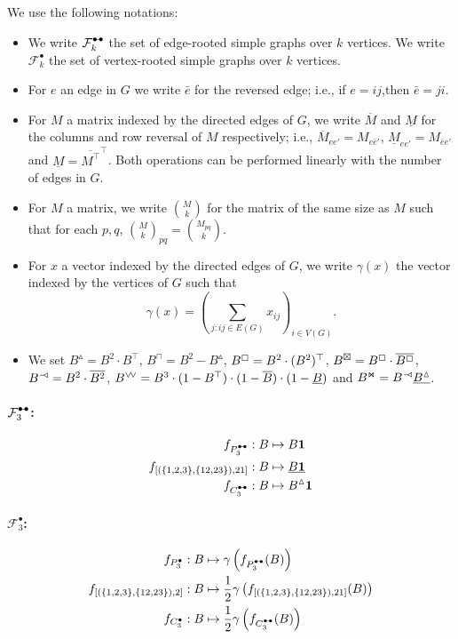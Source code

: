 \documentclass{article}
\theoremstyle{plain}
\begin{document}
We use the following notations:
\begin{itemize}
\item We write $\mathcal{F}_k^{\textcolor{black}{\bullet\!\!-\!\!\bullet}}$ the set of edge-rooted simple graphs over $k$ vertices. We write $\mathcal{F}_k^\bullet$ the set of vertex-rooted simple graphs over $k$ vertices. 
\item For $e$ an edge in $G$ we write $\bar e$ for the reversed edge; i.e., if $e=ij$,then $\bar e = ji$.
\item For $M$ a matrix indexed by the directed edges of $G$, we write $\overline M$ and $\underline M$ for the columns and row reversal of $M$ respectively; i.e., $\overline M_{ee'} = M_{ e \bar e'}$, $\underline M_{ee'} = M_{\bar e e'}$ and $\underline M = \overline{M^\top}^\top$. Both operations can be performed linearly with the number of edges in $G$.
\item For $M$ a matrix, we write $\binom{M}{k}$ for the matrix of the same size as $M$ such that for each $p,q$, $\binom{M}{k}_{pq} = \binom{M_{pq}}{k}$. 
\item For $x$ a vector indexed by the directed edges of $G$, we write $\gamma(x)$ the vector indexed by the vertices of $G$ such that 
\[
\gamma(x) = \left(\sum_{j:ij\in E(G)} x_{ij}\right)
_{i\in V(G)}.
\]
\item We set $B^\vartriangle = B^2\cdot B^\top$, $B^\sqcap = B^2-B^\vartriangle$, $B^\boxempty = B^2\cdot (B^2)^\top$, $B^\boxtimes = B^\boxempty\cdot\overline{B^\boxempty}$, $B^{ \frac{\ }{\ }\hspace{-2pt}\triangleleft } = B^2\cdot \overline{B^2}$, $B^{ \vee\!\vee } = B^3\cdot(1- B^\top)\cdot(1-\overline{B})\cdot(1-\underline{B})$ and $B^{\Join} = B^{ \frac{\ }{\ }\hspace{-2pt}\triangleleft } \underline{B^\vartriangle}$.
\end{itemize}
\paragraph{$\mathcal{F}_3^{\textcolor{black}{\bullet\!\!-\!\!\bullet}}$:}
\begin{align*}
f_{P_3^\dumbbell}: B&\mapsto B{\bf 1}\\
f_{[(\{1,2,3\},\{12,23\}),21]}: B&\mapsto \underline{B{\bf 1}}\\
f_{C_3^\dumbbell}: B&\mapsto B^\vartriangle{\bf 1}
\end{align*}
\paragraph{$\mathcal{F}_3^\bullet$:}
\begin{align*}
f_{P_3^\bullet}: B&\mapsto \gamma\left(f_{P_3^\dumbbell}(B)\right)\\
f_{[(\{1,2,3\},\{12,23\}),2]}: B&\mapsto \frac{1}{2}\gamma\left(f_{[(\{1,2,3\},\{12,23\}),21]}(B)\right)\\
f_{C_3^\bullet}: B&\mapsto \frac{1}{2}\gamma\left(f_{C_3^\dumbbell}(B)\right)
\end{align*}
\end{document}
